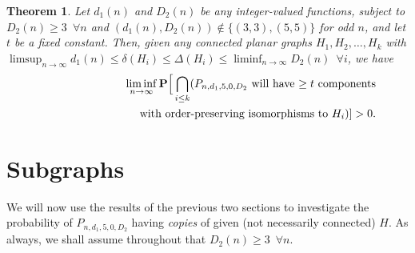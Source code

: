 \documentclass{article}
\newtheorem{Theorem}{Theorem}
\newtheorem{Proof of Theorem}{Proof of Theorem}
\begin{document}
\begin{Theorem} \label{bounded404}
Let $d_{1}(n)$ and $D_{2}(n)$ be any integer-valued functions, subject to $D_{2}(n) \geq 3$~$\forall n$
and $(d_{1}(n),D_{2}(n)) \notin \{ (3,3),(5,5) \}$ for odd $n$,
and let $t$ be a fixed constant.
Then, given any connected planar graphs 
$H_{1},H_{2}, \ldots, H_{k}$ with 
$\limsup_{n \to \infty} d_{1}(n) \leq \delta(H_{i}) \leq \Delta(H_{i}) 
\leq \liminf_{n \to \infty} D_{2}(n)$~$\forall i$,
we have
\begin{eqnarray*}
& & \liminf_{n \to \infty}
\mathbf{P}
\Big[ \bigcap_{i \leq k} (P_{n,d_{1},5,0,D_{2}} 
\textrm{ will have $\geq t$ components} \\
& & \textrm{\phantom{wwwwwwwwwww}with order-preserving isomorphisms to $H_{i}$} ) ] > 0.
\end{eqnarray*}
\end{Theorem}













































\newpage
\section{Subgraphs} \label{subs}















We will now use the results of the previous two sections to investigate the probability of $P_{n,d_{1},5,0,D_{2}}$
having \textit{copies} of given (not necessarily connected) $H$.
As always, we shall assume throughout that $D_{2}(n) \geq 3$~$\forall n$.
\end{document}
